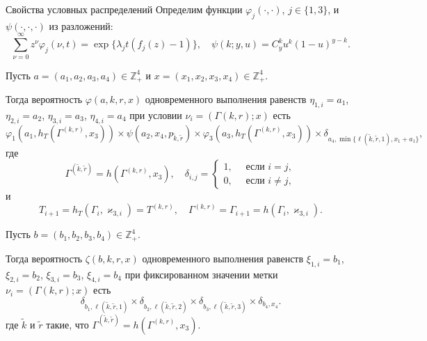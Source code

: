 \documentclass[10pt]{beamer}
\begin{document}
\begin{frame}[allowframebreaks]{Свойства условных распределений}
Определим функции $\varphi_j(\cdot,\cdot)$, $j\in \{1,3\}$, и $\psi(\cdot, \cdot, \cdot)$ из разложений:
\begin{equation*}
\sum_{\nu=0}^{\infty} z^\nu\varphi_j(\nu,t) = \exp\{\lambda_j t (f_j(z)-1)\}, \quad \psi(k;y,u)=C_y^k u^k (1-u)^{y-k}.	
\end{equation*}

Пусть $a=(a_1, a_2, a_3, a_4) \in \mathbb{Z}_+^4$ и $x=(x_1, x_2, x_3, x_4) \in \mathbb{Z}_+^4$.

Тогда вероятность $\varphi(a,k,r,x)$ одновременного выполнения равенств $\eta_{1,i}=a_1$, $\eta_{2,i}=a_2$, $\eta_{3,i}=a_3$, $\eta_{4,i}=a_4$ при условии  $\nu_i=(\Gamma{(k,r)}; x)$ есть 
\begin{equation}
\!\!\varphi_1(a_1,h_T(\Gamma^{({k},{r})},x_3)) \times \psi(a_2,x_4, p_{\tilde{k},\tilde{r}}) \times \varphi_3(a_3,h_T(\Gamma^{({k},{r})},x_3))
\times \delta_{a_4,\min{\{\ell(\tilde{k},\tilde{r},1), x_1+a_1}\}},
\label{prob:1}
\end{equation}
где
\begin{equation*}
\Gamma^{(\tilde{k},\tilde{r})}=h(\Gamma^{(k,r)},x_3), \quad \delta_{i,j}=\begin{cases} 1, \quad \text{ если }i=j,\\0, \quad \text{ если } i\neq j,
\end{cases}
\end{equation*}
и 
$$
T_{i+1}=h_T(\Gamma_i,\varkappa_{3,i})= T^{(k,r)},\quad  \Gamma^{(k,r)}=\Gamma_{i+1}=h(\Gamma_i,\varkappa_{3,i}).
$$
\framebreak

Пусть $b=(b_1, b_2, b_3, b_4) \in \mathbb{Z}_+^4$. 

Тогда вероятность $\zeta(b, k, r, x)$ одновременного выполнения равенств $\xi_{1,i}=b_1$, $\xi_{2,i}=b_2$, $\xi_{3,i}=b_3$, $\xi_{4,i}=b_4$ при фиксированном значении метки $\nu_i=(\Gamma{(k,r)}; x)$ есть
\begin{equation}
\delta_{b_1,\ell(\tilde{k},\tilde{r},1)} \times \delta_{b_2,\ell(\tilde{k},\tilde{r},2)} \times 
\delta_{b_3,\ell(\tilde{k},\tilde{r},3)} \times \delta_{b_4,x_4}.
\label{prob:2}
\end{equation}
где $\tilde{k}$ и $\tilde{r}$ такие, что $\Gamma^{(\tilde{k},\tilde{r})}=h(\Gamma^{(k,r)},x_3)$.
\end{frame}
\end{document}
